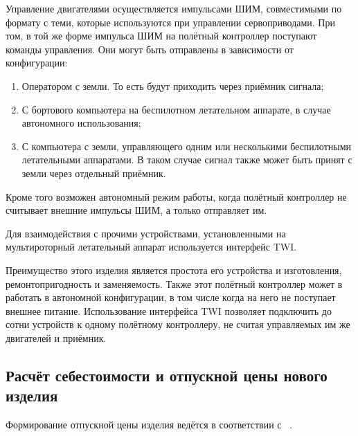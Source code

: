 
Управление двигателями осуществляется импульсами ШИМ, совместимыми по
формату с теми, которые используются при управлении
сервоприводами. При том, в той же форме импульса ШИМ на полётный
контроллер поступают команды управления.  Они могут быть отправлены в
зависимости от конфигурации:
\begin{enumerate}
\item Оператором с земли. То есть будут приходить через приёмник сигнала;
\item С бортового компьютера на беспилотном летательном аппарате, в случае автономного использования;
\item С компьютера с земли, управляющего одним или несколькими
беспилотными летательными аппаратами. В таком случае сигнал также
может быть принят с земли через отдельный приёмник.
\end{enumerate}
Кроме того возможен автономный режим работы, когда полётный контроллер
не считывает внешние импульсы ШИМ, а только отправляет им.

Для взаимодействия с прочими устройствами, установленными на
мультироторный летательный аппарат используется интерфейс TWI.


Преимущество этого изделия является простота его устройства и
изготовления, ремонтопригодность и заменяемость.
Также этот полётный контроллер может в работать в автономной
конфигурации, в том числе когда на него не поступает внешнее питание.
Использование интерфейса TWI позволяет подключить до сотни
устройств к одному полётному контроллеру, не считая управляемых им же
двигателей и приёмник.


\subsection{Расчёт себестоимости и отпускной цены нового изделия}

Формирование отпускной цены изделия ведётся в соответствии с
~\cite{bsuir-project-economics}.

